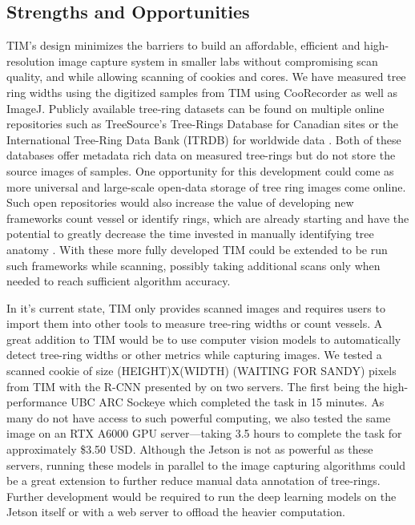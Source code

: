 \documentclass[a4paper,12pt]{article}
\begin{document}
\subsection{Strengths and Opportunities} %
TIM's design minimizes the barriers to build an affordable, efficient and high-resolution image capture system in smaller labs without compromising scan quality, and while allowing scanning of cookies and cores. We have measured tree ring widths using the digitized samples from TIM using CooRecorder as well as ImageJ.
Publicly available tree-ring datasets can be found on multiple online repositories such as TreeSource's Tree-Rings Database for Canadian sites or the International Tree-Ring Data Bank (ITRDB) for worldwide data \citep{girardin_national_2021} \citep{grissino-mayer_international_1997}.
Both of these databases offer metadata rich data on measured tree-rings but do not store the source images of samples.
One opportunity for this development could come as more universal and large-scale open-data storage of tree ring images come online. 
Such open repositories would also increase the value of developing new frameworks count vessel or identify rings, which are already starting and have the potential to greatly decrease the time invested in manually identifying tree anatomy \citep{resente_mask_2021} \citep{polacek_automation_2023}. 
With these more fully developed TIM could be extended to be run such frameworks while scanning, possibly taking additional scans only when needed to reach sufficient algorithm accuracy. %

In it's current state, TIM only provides scanned images and requires users to import them into other tools to measure tree-ring widths or count vessels.
A great addition to TIM would be to use computer vision models to automatically detect tree-ring widths or other metrics while capturing images.  
We tested a scanned cookie of size (HEIGHT)X(WIDTH) (WAITING FOR SANDY) pixels from TIM with the R-CNN presented by \citeauthor{polacek_automation_2023} on two servers. The first being the high-performance UBC ARC Sockeye which completed the task in 15 minutes. 
As many do not have access to such powerful computing, we also tested the same image on an RTX A6000 GPU server---taking 3.5 hours to complete the task for approximately \$3.50 USD. 
Although the Jetson is not as powerful as these servers, running these models in parallel to the image capturing algorithms could be a great extension to further reduce manual data annotation of tree-rings.
Further development would be required to run the deep learning models on the Jetson itself or with a web server to offload the heavier computation. 
\end{document}
